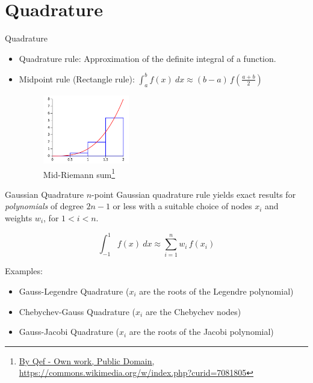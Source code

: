 \documentclass[xcolor=pdftex,table,10pt,yellow,mathserif]{beamer}
\begin{document}
\section{Quadrature}

\begin{frame}{Quadrature}
    \begin{itemize}
        \item Quadrature rule: Approximation of the definite integral of a function.
        \item Midpoint rule (Rectangle rule): $\displaystyle
                \int_a^b f(x) \ dx \approx (b-a) \, f \left(\frac{a + b}{2}\right)
            $

            \begin{figure}
            \includegraphics[height=3cm]{figures/MidRiemann2.svg.png}
            \caption{
                Mid-Riemann sum\footnote{\href{https://en.wikipedia.org/wiki/Riemann\_sum\#/media/File:MidRiemann2.svg}{By Qef - Own work, Public Domain, https://commons.wikimedia.org/w/index.php?curid=7081805}}
            }
            \end{figure}
            
    \end{itemize}

\end{frame}

\begin{frame}{Gaussian Quadrature}
    $n$-point Gaussian quadrature rule yields exact results for \emph{polynomials} 
    of degree $2n - 1$ or less with a suitable choice of nodes $x_i$ and weights $w_i$, for $1 < i < n$.

    \[
        \int_{-1}^{1} f(x) \ dx \approx \sum_{i=1}^n w_i \, f(x_i)
    \]

    Examples:
    \begin{itemize}
        \item Gauss-Legendre Quadrature ($x_i$ are the roots of the Legendre polynomial)
        \item Chebychev-Gauss Quadrature ($x_i$ are the Chebychev nodes)
        \item Gauss-Jacobi Quadrature ($x_i$ are the roots of the Jacobi polynomial)
    \end{itemize}
\end{frame}
\end{document}

